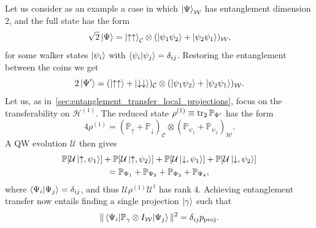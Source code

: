 \documentclass[
	aps, pra,
	superscriptaddress, twocolumn,
	floatfix,
	10pt
]{revtex4-1}
\newcommand{\on}[1]{\operatorname{#1}}
\newcommand{\parTitle}[1]{\noindent{\color{Mahogany}(\emph{#1})}}
\newcommand{\PP}{\mathbb{P}}
\newcommand{\calC}{{\mathcal{C}}}
\newcommand{\calH}{{\mathcal{H}}}
\newcommand{\calU}{{\mathcal{U}}}
\newcommand{\calW}{{\mathcal{W}}}
\newcommand{\commale}[1]{{\textcolor{red} {\it{[Note (Ale): #1]}}}}
\renewcommand{\parTitle}[1]{}
\begin{document}
\parTitle{Entanglement accumulation, problem statement}
Let us consider as an example a case in which $\ket{\Psi}_\calW$ has entanglement dimension $2$, and the full state has the form
\begin{equation}
	\sqrt2 \ket{\Psi} =
	\ket{\uparrow\uparrow}_{\calC}
	\otimes
	(\ket{\psi_1\psi_2} + \ket{\psi_2\psi_1})_{\calW},
\end{equation}
for some walker states $\ket{\psi_i}$ with $\braket{\psi_i}{\psi_j}=\delta_{ij}$.
Restoring the entanglement between the coins we get
\begin{equation}
	2 \ket{\Psi'} =
	(\ket{\uparrow\uparrow}+ \ket{\downarrow\downarrow})_{\calC}
	\otimes
	(\ket{\psi_1\psi_2} + \ket{\psi_2\psi_1})_{\calW}.
	\label{eq:ent_acc_initial_state}
\end{equation}
Let us, as in~\cref{sec:entanglement_transfer_local_projections}, focus on the transferability on $\calH^{(1)}$.
The reduced state $\rho^{(1)}\equiv\tr_2\PP_{\Psi'}$ has the form
\begin{equation}
	4\rho^{(1)} =
	(\PP_\uparrow + \PP_\downarrow)_\calC
	\otimes
	(\PP_{\psi_1} + \PP_{\psi_2})_\calW.
\end{equation}
A QW evolution $\calU$ then gives
\begin{equation}
\begin{gathered}
	\PP[\calU\ket{\uparrow,\psi_1}] + 
	\PP[\calU\ket{\uparrow,\psi_2}] + 
	\PP[\calU\ket{\downarrow,\psi_1}] + 
	\PP[\calU\ket{\downarrow,\psi_2}] \\
	= \PP_{\Psi_1} + \PP_{\Psi_2} + \PP_{\Psi_3} + \PP_{\Psi_4},
\end{gathered}
\label{eq:accum}
\end{equation}
where $\braket{\Psi_i}{\Psi_j}=\delta_{ij}$, and thus $\calU\rho^{(1)}\calU^\dagger$ has rank $4$.
Achieving entanglement transfer now entails finding a single projection $\ket\gamma$ such that
\begin{equation}
	\|\mel{\Psi_i}{\PP_\gamma\otimes I_\calW}{\Psi_j}\|^2 = \delta_{ij} p_{\on{proj}}.
\end{equation}
\end{document}
